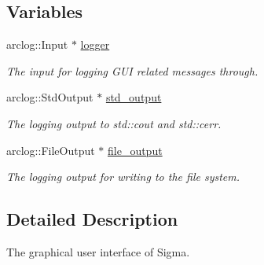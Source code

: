 \subsection*{Variables}
\begin{DoxyCompactItemize}
\item 
\hypertarget{namespacesigma_1_1gui_a9d8c6737746c5e1adb36699753b9c779}{arclog\-::\-Input $\ast$ \hyperlink{namespacesigma_1_1gui_a9d8c6737746c5e1adb36699753b9c779}{logger}}\label{namespacesigma_1_1gui_a9d8c6737746c5e1adb36699753b9c779}

\begin{DoxyCompactList}\small\item\em The input for logging G\-U\-I related messages through. \end{DoxyCompactList}\item 
\hypertarget{namespacesigma_1_1gui_aee3d12d4541eed9a3ad5e1681e2d33f4}{arclog\-::\-Std\-Output $\ast$ \hyperlink{namespacesigma_1_1gui_aee3d12d4541eed9a3ad5e1681e2d33f4}{std\-\_\-output}}\label{namespacesigma_1_1gui_aee3d12d4541eed9a3ad5e1681e2d33f4}

\begin{DoxyCompactList}\small\item\em The logging output to std\-::cout and std\-::cerr. \end{DoxyCompactList}\item 
\hypertarget{namespacesigma_1_1gui_a4dac0343b8b9c88faaf3a39bf298e690}{arclog\-::\-File\-Output $\ast$ \hyperlink{namespacesigma_1_1gui_a4dac0343b8b9c88faaf3a39bf298e690}{file\-\_\-output}}\label{namespacesigma_1_1gui_a4dac0343b8b9c88faaf3a39bf298e690}

\begin{DoxyCompactList}\small\item\em The logging output for writing to the file system. \end{DoxyCompactList}\end{DoxyCompactItemize}


\subsection{Detailed Description}
The graphical user interface of Sigma. 